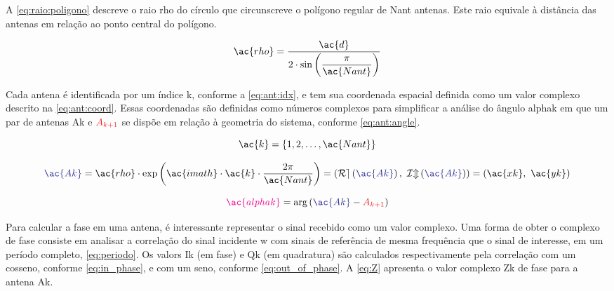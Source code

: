 A \autoref{eq:raio:poligono} descreve o raio \ac{rho} do círculo que circunscreve o polígono regular de \ac{Nant} antenas.
Este raio equivale à distância das antenas em relação ao ponto central do polígono.

\begin{equation} \label{eq:raio:poligono} %
	\ac{rho} = \frac{\ac{d}}{2\cdot \sin\left(\displaystyle\frac{\pi}{\ac{Nant}}\right)}
\end{equation}

Cada antena é identificada por um índice \ac{k}, conforme a \autoref{eq:ant:idx}, e tem sua coordenada espacial definida como um valor complexo descrito na \autoref{eq:ant:coord}.
Essas coordenadas são definidas como números complexos para simplificar a análise do ângulo \textcolor{cmyk_M}{\ac{alphak}} em que um par de antenas \textcolor{cmyk_B}{\ac{Ak}} e $\textcolor{cmyk_R}{A_{k+1}}$ se dispõe em relação à geometria do sistema, conforme \autoref{eq:ant:angle}.

\begin{equation} \label{eq:ant:idx} %
	\ac{k} = \left\{1, 2, \dotsc, \ac{Nant}\right\}
\end{equation}

\begin{equation} \label{eq:ant:coord}
	\textcolor{cmyk_B}{\ac{Ak}} =
    \ac{rho}
    \cdot \exp\left(\ac{imath}\cdot \ac{k} \cdot \frac{2\pi}{\ac{Nant}}\right) =
    \left( \operatorname{\mathcal{Re}}\left( \textcolor{cmyk_B}{\ac{Ak}} \right), ~\operatorname{\mathcal{Im}}\left( \textcolor{cmyk_B}{\ac{Ak}} \right) \right) =
    \left( \ac{xk}, ~ \ac{yk} \right)
\end{equation}

\begin{equation} \label{eq:ant:angle}
	\textcolor{cmyk_M}{\ac{alphak}} = \arg\left( \textcolor{cmyk_B}{\ac{Ak}} - \textcolor{cmyk_R}{A_{k+1}} \right)
\end{equation}


Para calcular a fase em uma antena, é interessante representar o sinal recebido como um valor complexo.
Uma forma de obter o complexo de fase consiste em analisar a correlação do sinal incidente \ac{w} com sinais de referência de mesma frequência que o sinal de interesse, em um período completo, \autoref{eq:periodo}.
Os valors \ac{Ik} (em fase) e \ac{Qk} (em quadratura) são calculados respectivamente pela correlação com um cosseno, conforme \autoref{eq:in_phase}, e com um seno, conforme \autoref{eq:out_of_phase}.
A \autoref{eq:Z} apresenta o valor complexo \textcolor{cmyk_B}{\ac{Zk}} de fase para a antena \textcolor{cmyk_B}{\ac{Ak}}.


